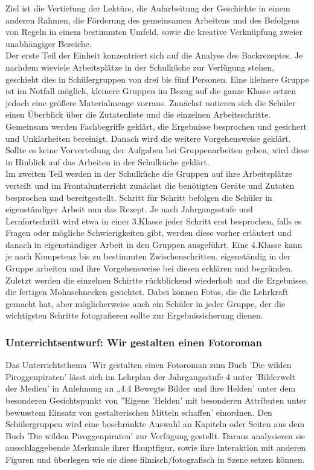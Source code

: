 Ziel ist die Vertiefung der Lektüre, die Aufarbeitung der Geschichte in einem anderen Rahmen, die Förderung des gemeinsamen Arbeitens und des Befolgens von Regeln in einem bestimmten Umfeld, sowie die kreative Verknüpfung zweier unabhängiger Bereiche.
\\
Der erste Teil der Einheit konzentriert sich auf die Analyse des Backrezeptes. Je nachdem wieviele Arbeitsplätze in der Schulküche zur Verfügung stehen, geschieht dies in Schülergruppen von drei bis fünf Personen. Eine kleinere Gruppe ist im Notfall möglich, kleinere Gruppen im Bezug auf die ganze Klasse setzen jedoch eine größere Materialmenge vorraus. Zunächst notieren sich die Schüler einen Überblick über die Zutatenliste und die einzelnen Arbeitsschritte. Gemeinsam werden Fachbegriffe geklärt, die Ergebnisse besprochen und gesichert und Unklarheiten bereinigt. Danach wird die weitere Vorgehensweise geklärt. Sollte es keine Vorverteilung der Aufgaben bei Gruppenarbeiten geben, wird diese in Hinblick auf das Arbeiten in der Schulküche geklärt.
\\
Im zweiten Teil werden in der Schulküche die Gruppen auf ihre Arbeitsplätze verteilt und im Frontalunterricht zunächst die benötigten Geräte und Zutaten besprochen und bereitgestellt. Schritt für Schritt befolgen die Schüler in eigenständiger Arbeit nun das Rezept. Je nach Jahrgangsstufe und Lernfortschritt wird etwa in einer 3.Klasse  jeder Schritt erst besprochen, falls es Fragen oder mögliche Schwierigkeiten gibt, werden diese vorher erläutert und danach in eigenständiger Arbeit in den Gruppen ausgeführt. Eine 4.Klasse kann je nach Kompetenz bis zu bestimmten Zwischenschritten, eigenständig in der Gruppe arbeiten und ihre Vorgehensweise bei diesen erklären und begründen.
\\
Zuletzt werden die einzelnen Schirtte rückblickend wiederholt und die Ergebnisse, die fertigen Mohnschnecken gesichtet. Dabei können Fotos, die die Lehrkraft gemacht hat, aber möglicherweise auch ein Schüler in jeder Gruppe, der die wichtigsten Schritte fotografieren sollte zur Ergebnissicherung dienen.

\subsubsection{Unterrichtsentwurf: Wir gestalten einen Fotoroman}

Das Unterrichtsthema 'Wir gestalten einen Fotoroman zum Buch 'Die wilden Piroggenpiraten' lässt sich im Lehrplan der Jahrgangsstufe 4 unter 'Bilderwelt der Medien' in Anlehnung an „4.4 Bewegte Bilder und ihre Helden' \cite[S.279]{LP GS 2000} unter dem besonderen Gesichtspunkt von ''Eigene 'Helden' mit besonderen Attributen unter bewusstem Einsatz von gestalterischen Mitteln schaffen' einordnen. Den Schülergruppen wird eine beschränkte Auswahl an Kapiteln oder Seiten aus dem Buch 'Die wilden Piroggenpiraten' zur Verfügung gestellt. Daraus analysieren sie ausschlaggebende Merkmale ihrer Hauptfigur, sowie ihre Interaktion mit anderen Figuren und überlegen wie sie diese filmisch/fotografisch in Szene setzen können. 

